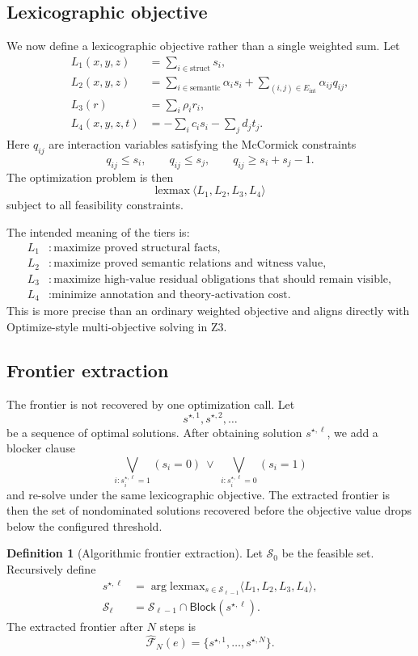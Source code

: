 \documentclass[11pt]{article}
\newcommand{\Zthree}{\textsc{Z3}}
\theoremstyle{definition}
\newtheorem{definition}{Definition}[section]
\theoremstyle{plain}
\begin{document}
\subsection{Lexicographic objective}
We now define a lexicographic objective rather than a single weighted sum. Let
\begin{align*}
L_1(x,y,z) &= \sum_{i \in \mathrm{struct}} s_i, \\
L_2(x,y,z) &= \sum_{i \in \mathrm{semantic}} \alpha_i s_i + \sum_{(i,j) \in E_{\mathrm{int}}} \alpha_{ij} q_{ij}, \\
L_3(r) &= \sum_i \rho_i r_i, \\
L_4(x,y,z,t) &= -\sum_i c_i s_i - \sum_j d_j t_j.
\end{align*}
Here $q_{ij}$ are interaction variables satisfying the McCormick constraints
\[
q_{ij} \le s_i, \qquad q_{ij} \le s_j, \qquad q_{ij} \ge s_i + s_j - 1.
\]
The optimization problem is then
\[
\mathrm{lexmax}\ \langle L_1, L_2, L_3, L_4 \rangle
\]
subject to all feasibility constraints.

The intended meaning of the tiers is:
\begin{align*}
L_1 &: \text{maximize proved structural facts}, \\
L_2 &: \text{maximize proved semantic relations and witness value}, \\
L_3 &: \text{maximize high-value residual obligations that should remain visible}, \\
L_4 &: \text{minimize annotation and theory-activation cost.}
\end{align*}
This is more precise than an ordinary weighted objective and aligns directly with
Optimize-style multi-objective solving in \Zthree{}.

\subsection{Frontier extraction}
The frontier is not recovered by one optimization call. Let
\[
s^{\star,1}, s^{\star,2}, \ldots
\]
be a sequence of optimal solutions. After obtaining solution $s^{\star,\ell}$, we
add a blocker clause
\[
\bigvee_{i : s^{\star,\ell}_i = 1} (s_i = 0) \ \vee \ 
\bigvee_{i : s^{\star,\ell}_i = 0} (s_i = 1)
\]
and re-solve under the same lexicographic objective. The extracted frontier is
then the set of nondominated solutions recovered before the objective value drops
below the configured threshold.

\begin{definition}[Algorithmic frontier extraction]
Let $\mathcal{S}_0$ be the feasible set. Recursively define
\begin{align*}
s^{\star,\ell} &= \arg\mathrm{lexmax}_{s \in \mathcal{S}_{\ell-1}} \langle L_1, L_2, L_3, L_4 \rangle, \\
\mathcal{S}_{\ell} &= \mathcal{S}_{\ell-1} \cap \mathsf{Block}(s^{\star,\ell}).
\end{align*}
The extracted frontier after $N$ steps is
\[
\widehat{\mathcal{F}}_N(e) = \{ s^{\star,1}, \ldots, s^{\star,N} \}.
\]
\end{definition}
\end{document}
